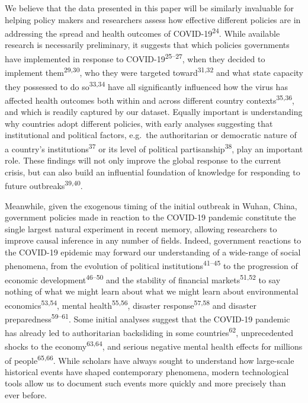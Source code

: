 \documentclass[]{article}
\begin{document}
We believe that the data presented in this paper will be similarly invaluable for helping policy makers and researchers assess how effective different policies are in addressing the spread and health outcomes of COVID-19\textsuperscript{24}. While available research is necessarily preliminary, it suggests that which policies governments have implemented in response to COVID-19\textsuperscript{25--27}, when they decided to implement them\textsuperscript{29,30}, who they were targeted toward\textsuperscript{31,32} and what state capacity they possessed to do so\textsuperscript{33,34} have all significantly influenced how the virus has affected health outcomes both within and across different country contexts\textsuperscript{35,36}, and which is readily captured by our dataset. Equally important is understanding why countries adopt different policies, with early analyses suggesting that institutional and political factors, e.g.~the authoritarian or democratic nature of a country's institutions\textsuperscript{37} or its level of political partisanship\textsuperscript{38}, play an important role. These findings will not only improve the global response to the current crisis, but can also build an influential foundation of knowledge for responding to future outbreaks\textsuperscript{39,40}.

Meanwhile, given the exogenous timing of the initial outbreak in Wuhan, China, government policies made in reaction to the COVID-19 pandemic constitute the single largest natural experiment in recent memory, allowing researchers to improve causal inference in any number of fields. Indeed, government reactions to the COVID-19 epidemic may forward our understanding of a wide-range of social phenomena, from the evolution of political institutions\textsuperscript{41--45} to the progression of economic development\textsuperscript{46--50} and the stability of financial markets\textsuperscript{51,52} to say nothing of what we might learn about what we might learn about environmental economics\textsuperscript{53,54}, mental health\textsuperscript{55,56}, disaster response\textsuperscript{57,58} and disaster preparedness\textsuperscript{59--61}. Some initial analyses suggest that the COVID-19 pandemic has already led to authoritarian backsliding in some countries\textsuperscript{62}, unprecedented shocks to the economy\textsuperscript{63,64}, and serious negative mental health effects for millions of people\textsuperscript{65,66}. While scholars have always sought to understand how large-scale historical events have shaped contemporary phenomena, modern technological tools allow us to document such events more quickly and more precisely than ever before.
\end{document}
